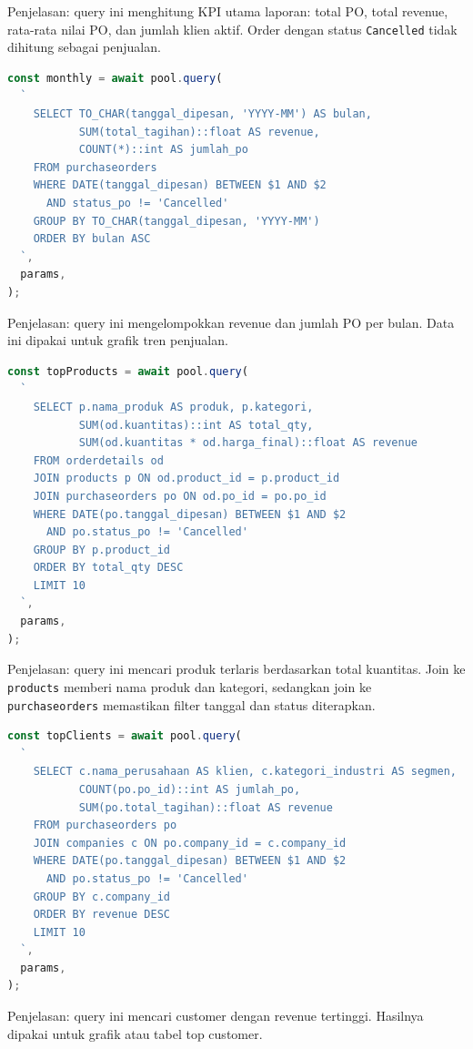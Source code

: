 \documentclass[11pt,a4paper]{article}
\begin{document}
Penjelasan: query ini menghitung KPI utama laporan: total PO, total revenue, rata-rata nilai PO, dan jumlah klien aktif. Order dengan status \texttt{Cancelled} tidak dihitung sebagai penjualan.

\begin{lstlisting}[language=JavaScript]
const monthly = await pool.query(
  `
    SELECT TO_CHAR(tanggal_dipesan, 'YYYY-MM') AS bulan,
           SUM(total_tagihan)::float AS revenue,
           COUNT(*)::int AS jumlah_po
    FROM purchaseorders
    WHERE DATE(tanggal_dipesan) BETWEEN $1 AND $2
      AND status_po != 'Cancelled'
    GROUP BY TO_CHAR(tanggal_dipesan, 'YYYY-MM')
    ORDER BY bulan ASC
  `,
  params,
);
\end{lstlisting}

Penjelasan: query ini mengelompokkan revenue dan jumlah PO per bulan. Data ini dipakai untuk grafik tren penjualan.

\begin{lstlisting}[language=JavaScript]
const topProducts = await pool.query(
  `
    SELECT p.nama_produk AS produk, p.kategori,
           SUM(od.kuantitas)::int AS total_qty,
           SUM(od.kuantitas * od.harga_final)::float AS revenue
    FROM orderdetails od
    JOIN products p ON od.product_id = p.product_id
    JOIN purchaseorders po ON od.po_id = po.po_id
    WHERE DATE(po.tanggal_dipesan) BETWEEN $1 AND $2
      AND po.status_po != 'Cancelled'
    GROUP BY p.product_id
    ORDER BY total_qty DESC
    LIMIT 10
  `,
  params,
);
\end{lstlisting}

Penjelasan: query ini mencari produk terlaris berdasarkan total kuantitas. Join ke \texttt{products} memberi nama produk dan kategori, sedangkan join ke \texttt{purchaseorders} memastikan filter tanggal dan status diterapkan.

\begin{lstlisting}[language=JavaScript]
const topClients = await pool.query(
  `
    SELECT c.nama_perusahaan AS klien, c.kategori_industri AS segmen,
           COUNT(po.po_id)::int AS jumlah_po,
           SUM(po.total_tagihan)::float AS revenue
    FROM purchaseorders po
    JOIN companies c ON po.company_id = c.company_id
    WHERE DATE(po.tanggal_dipesan) BETWEEN $1 AND $2
      AND po.status_po != 'Cancelled'
    GROUP BY c.company_id
    ORDER BY revenue DESC
    LIMIT 10
  `,
  params,
);
\end{lstlisting}

Penjelasan: query ini mencari customer dengan revenue tertinggi. Hasilnya dipakai untuk grafik atau tabel top customer.
\end{document}
